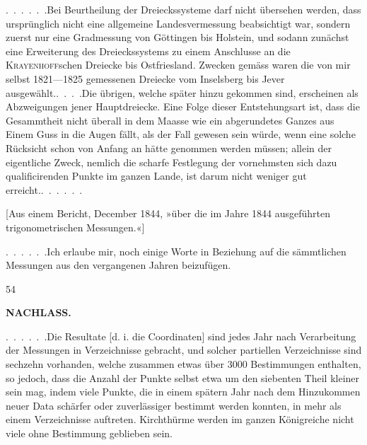 \par\noindent\hspace*{\parindent}\mbox{.\ .\ .\ .\ .\ .}\quad Bei Beurtheilung der Dreieckssysteme darf nicht übersehen werden, dass ursprünglich nicht eine allgemeine Landesvermessung beabsichtigt war, sondern zuerst nur eine Gradmessung von Göttingen bis Holstein, und sodann zunächst eine Erweiterung des Dreieckssystems zu einem Anschlusse an die \textsc{Krayenhoff}schen Dreiecke bis Ostfriesland.  Zwecken gemäss waren die von mir selbst 1821---1825 gemessenen Dreiecke vom Inselsberg bis Jever \mbox{ausgewählt.\enspace\mbox{.\ .\ .\ .}}\quad Die übrigen, welche später hinzu gekommen sind, erscheinen als Abzweigungen jener Hauptdreiecke. Eine Folge dieser Entstehungsart ist, dass die Gesammtheit nicht überall in dem Maasse wie ein abgerundetes Ganzes aus Einem Guss in die Augen fällt, als der Fall gewesen sein würde, wenn eine solche Rücksicht schon von Anfang an hätte genommen werden müssen; allein der eigentliche Zweck, nemlich die scharfe Festlegung der vornehmsten sich dazu qualificirenden Punkte im ganzen Lande, ist darum nicht weniger gut \mbox{erreicht.\enspace\mbox{.\ .\ .\ .\ .\ .}}

\par\medskip
\begin{center}
[Aus einem Bericht, December 1844, »über die im Jahre 1844 ausgeführten\\
trigonometrischen Messungen.«]
\end{center}

\par\noindent\hspace*{\parindent}\mbox{.\ .\ .\ .\ .\ .}\quad Ich erlaube mir, noch einige Worte in Beziehung auf die sämmtlichen Messungen aus den vergangenen Jahren beizufügen.

\par\smallskip\noindent\hspace*{.03\linewidth}{\footnotesize IX.}\hfill{\footnotesize 54}\hspace*{.12\linewidth}\par

\par\clearpage
\noindent{}\hfill{\small\textbf{NACHLASS.}}\hfill\null\par\medskip

\par\noindent\hspace*{\parindent}\mbox{.\ .\ .\ .\ .\ .}\quad Die Resultate [d. i. die Coordinaten] sind jedes Jahr nach Verarbeitung der Messungen in Verzeichnisse gebracht, und solcher partiellen Verzeichnisse sind sechzehn vorhanden, welche zusammen etwas über 3000 Bestimmungen enthalten, so jedoch, dass die Anzahl der Punkte selbst etwa um den siebenten Theil kleiner sein mag, indem viele Punkte, die in einem spätern Jahr nach dem Hinzukommen neuer Data schärfer oder zuverlässiger bestimmt werden konnten, in mehr als einem Verzeichnisse auftreten. Kirchthürme werden im ganzen Königreiche nicht viele ohne Bestimmung geblieben sein.

